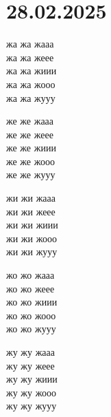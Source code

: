 \documentclass[a5paper,12pt]{article}
\begin{document}
\section{28.02.2025}
\begin{minipage}[t]{0.3\textwidth}
жа жа жааа\\ жа жа жеее\\ жа жа жиии\\ жа жа жооо\\ жа жа жууу
\end{minipage}
\hfill
\begin{minipage}[t]{0.3\textwidth}
же же жааа\\ же же жеее\\ же же жиии\\ же же жооо\\ же же жууу
\end{minipage}
\hfill
\begin{minipage}[t]{0.3\textwidth}
жи жи жааа\\ жи жи жеее\\ жи жи жиии\\ жи жи жооо\\ жи жи жууу
\end{minipage}

\vspace{0.5cm}

\begin{minipage}[t]{0.45\textwidth}
жо жо жааа\\ жо жо жеее\\ жо жо жиии\\ жо жо жооо\\ жо жо жууу
\end{minipage}
\hfill
\begin{minipage}[t]{0.45\textwidth}
жу жу жааа\\ жу жу жеее\\ жу жу жиии\\ жу жу жооо\\ жу жу жууу
\end{minipage}
\end{document}
